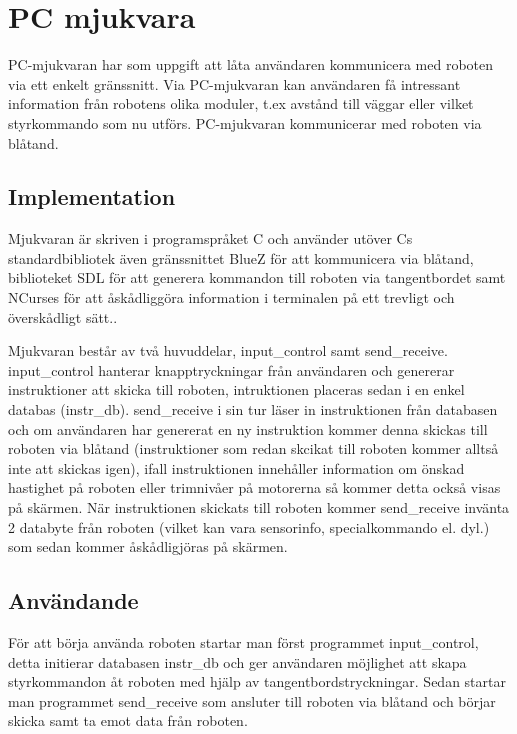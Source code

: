\section{PC mjukvara}
PC-mjukvaran har som uppgift att låta användaren kommunicera med roboten via ett
enkelt gränssnitt. Via PC-mjukvaran kan användaren få intressant information
från robotens olika moduler, t.ex avstånd till väggar eller vilket styrkommando
som nu utförs. PC-mjukvaran kommunicerar med roboten via blåtand.

\subsection{Implementation}

Mjukvaran är skriven i programspråket C och använder utöver Cs standardbibliotek
även gränssnittet BlueZ för att kommunicera via blåtand, biblioteket SDL för att
generera kommandon till roboten via tangentbordet samt NCurses för att
åskådliggöra information i terminalen på ett trevligt och överskådligt sätt..

Mjukvaran består av två huvuddelar, input\_control samt send\_receive. input\_control
hanterar knapptryckningar från användaren och genererar instruktioner att skicka
till roboten, intruktionen placeras sedan i en enkel databas (instr\_db).
send\_receive i sin tur läser in instruktionen från databasen och om användaren
har genererat en ny instruktion kommer denna skickas till roboten via blåtand
(instruktioner som redan skcikat till roboten kommer alltså inte att skickas
 igen), ifall instruktionen innehåller information om önskad hastighet på
roboten eller trimnivåer på motorerna så kommer detta också visas på skärmen.
När instruktionen skickats till roboten kommer send\_receive invänta 2 databyte
från roboten (vilket kan vara sensorinfo, specialkommando el. dyl.) som sedan
kommer åskådligjöras på skärmen.
\subsection{Användande} 

För att börja använda roboten startar man först programmet input\_control, detta
initierar databasen instr\_db och ger användaren möjlighet att skapa
styrkommandon åt roboten med hjälp av tangentbordstryckningar. Sedan startar man
programmet send\_receive som ansluter till roboten via blåtand och börjar skicka
samt ta emot data från roboten.

